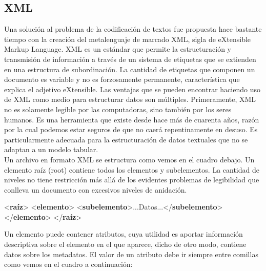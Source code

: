 \documentclass[
]{book}
\newenvironment{Shaded}{\begin{snugshade}}{\end{snugshade}}
\newcommand{\KeywordTok}[1]{\textcolor[rgb]{0.13,0.29,0.53}{\textbf{#1}}}
\newcommand{\NormalTok}[1]{#1}
\begin{document}
\hypertarget{xml}{%
\subsection*{XML}\label{xml}}

Una solución al problema de la codificación de textos fue propuesta hace bastante tiempo con la creación del metalenguaje de marcado XML, sigla de eXtensible Markup Language. XML es un estándar que permite la estructuración y transmisión de información a través de un sistema de etiquetas que se extienden en una estructura de subordinación. La cantidad de etiquetas que componen un documento es variable y no es forzosamente permanente, característica que explica el adjetivo eXtensible.
Las ventajas que se pueden encontrar haciendo uso de XML como medio para estructurar datos son múltiples. Primeramente, XML no es solamente legible por las computadoras, sino también por los seres humanos. Es una herramienta que existe desde hace más de cuarenta años, razón por la cual podemos estar seguros de que no caerá repentinamente en desuso. Es particularmente adecuada para la estructuración de datos textuales que no se adaptan a un modelo tabular.\\
Un archivo en formato XML se estructura como vemos en el cuadro debajo. Un elemento raíz (root) contiene todos los elementos y subelementos. La cantidad de niveles no tiene restricción más allá de los evidentes problemas de legibilidad que conlleva un documento con excesivos niveles de anidación.

\begin{Shaded}
\begin{Highlighting}[]
\NormalTok{\textless{}}\KeywordTok{raíz}\NormalTok{\textgreater{}}
\NormalTok{  \textless{}}\KeywordTok{elemento}\NormalTok{\textgreater{}}
\NormalTok{    \textless{}}\KeywordTok{subelemento}\NormalTok{\textgreater{}...Datos...\textless{}/}\KeywordTok{subelemento}\NormalTok{\textgreater{}}
\NormalTok{  \textless{}/}\KeywordTok{elemento}\NormalTok{\textgreater{}}
\NormalTok{\textless{}/}\KeywordTok{raíz}\NormalTok{\textgreater{}}
\end{Highlighting}
\end{Shaded}

Un elemento puede contener atributos, cuya utilidad es aportar información descriptiva sobre el elemento en el que aparece, dicho de otro modo, contiene datos sobre los metadatos. El valor de un atributo debe ir siempre entre comillas como vemos en el cuadro a continuación:
\end{document}
